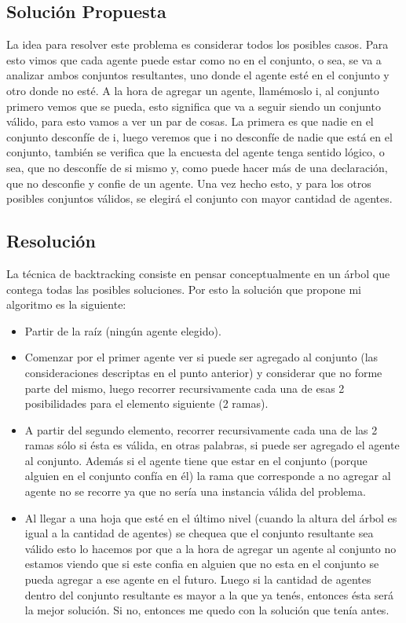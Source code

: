 \subsection{Solución Propuesta}

	La idea para resolver este problema es considerar todos los posibles casos. Para esto vimos que cada agente puede estar como no en el conjunto, o sea, se va a analizar ambos conjuntos resultantes, uno donde el agente esté en el conjunto y otro donde no esté. A la hora de agregar un agente, llamémoslo i, al conjunto primero vemos que se pueda, esto significa que va a seguir siendo un conjunto válido, para esto vamos a ver un par de cosas. La primera es que nadie en el conjunto desconfíe de i, luego veremos que i no desconfíe de nadie que está en el conjunto, también se verifica que la encuesta del agente tenga sentido lógico, o sea, que no desconfíe de si mismo y, como puede hacer más de una declaración, que no desconfie y confie de un agente. Una vez hecho esto, y  para los otros posibles conjuntos válidos, se elegirá el conjunto con mayor cantidad de agentes. 
	
\subsection{Resolución}
	La técnica de backtracking consiste en pensar conceptualmente en un árbol que contega todas las posibles soluciones. Por esto la solución que propone mi algoritmo es la siguiente:
	
\begin{itemize}
\setlength\itemsep{-0.2em}
\item Partir de la raíz (ningún agente elegido).
\item Comenzar por el primer agente ver si puede ser agregado al conjunto (las consideraciones descriptas en el punto anterior) y considerar que no forme parte del mismo, luego recorrer recursivamente cada una de esas 2 posibilidades para el elemento siguiente (2 ramas).
\item A partir del segundo elemento, recorrer recursivamente cada una de las 2 ramas sólo si ésta es válida, en otras palabras, si puede ser agregado el agente al conjunto. Además si el agente tiene que estar en el conjunto (porque alguien en el conjunto confía en él) la rama que corresponde a no agregar al agente no se recorre ya que no sería una instancia válida del problema.
\item Al llegar a una hoja que esté en el último nivel (cuando la altura del árbol es igual a la cantidad de agentes) se chequea que el conjunto resultante sea válido esto lo hacemos por que a la hora de agregar un agente al conjunto no estamos viendo que si este confia en alguien que no esta en el conjunto se pueda agregar a ese agente en el futuro. Luego si la cantidad de agentes dentro del conjunto resultante es mayor a la que ya tenés, entonces ésta será la mejor solución. Si no, entonces me quedo con la solución que tenía antes.
\end{itemize}
	

